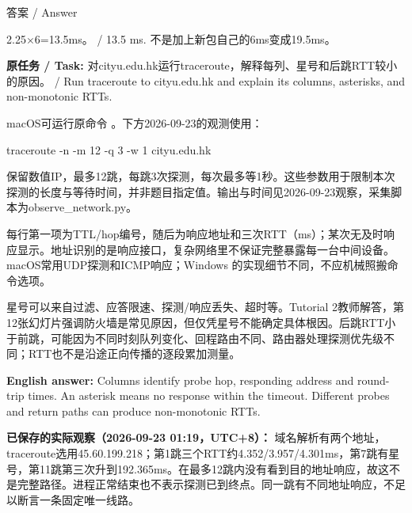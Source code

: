 \begin{StudySolution}{答案 / Answer}


2.25\ensuremath{\times}6=13.5ms。 / 13.5 ms. 不是加上新包自己的6ms变成19.5ms。


\end{StudySolution}








\textbf{原任务 / Task:} 对cityu.edu.hk运行traceroute，解释每列、星号和后跳RTT较小的原因。 / Run traceroute to cityu.edu.hk and explain its columns, asterisks, and non-monotonic RTTs.


macOS可运行原命令 。下方2026-09-23的观测使用：



\begin{StudyCode}
traceroute -n -m 12 -q 3 -w 1 cityu.edu.hk
\end{StudyCode}


保留数值IP，最多12跳，每跳3次探测，每次最多等1秒。这些参数用于限制本次探测的长度与等待时间，并非题目指定值。输出与时间见2026-09-23观察，采集脚本为observe\_network.py。


每行第一项为TTL/hop编号，随后为响应地址和三次RTT（ms）；某次无及时响应显示\StudyInline{*}。地址识别的是响应接口，复杂网络里不保证完整暴露每一台中间设备。macOS常用UDP探测和ICMP响应；Windows 的实现细节不同，不应机械照搬命令选项。


星号可以来自过滤、应答限速、探测/响应丢失、超时等。Tutorial 2教师解答，第12张幻灯片强调防火墙是常见原因，但仅凭星号不能确定具体根因。后跳RTT小于前跳，可能因为不同时刻队列变化、回程路由不同、路由器处理探测优先级不同；RTT也不是沿途正向传播的逐段累加测量。


\textbf{English answer:} Columns identify probe hop, responding address and round-trip times. An asterisk means no response within the timeout. Different probes and return paths can produce non-monotonic RTTs.


\textbf{已保存的实际观察（2026-09-23 01:19，UTC+8）：} 域名解析有两个地址，traceroute选用45.60.199.218；第1跳三个RTT约4.352/3.957/4.301ms，第7跳有星号，第11跳第三次升到192.365ms。在最多12跳内没有看到目的地址响应，故这不是完整路径。进程正常结束也不表示探测已到终点。同一跳有不同地址响应，不足以断言一条固定唯一线路。


